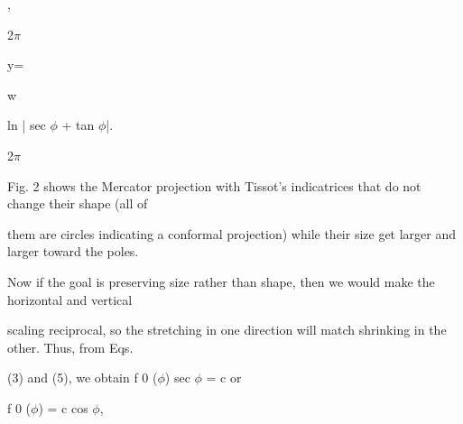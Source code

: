 \documentclass[a4paper,portrait,12pt]{article}
\begin{document}
,


\begin{flushleft}
2$\pi$
\end{flushleft}





\begin{flushleft}
y=
\end{flushleft}





\begin{flushleft}
w
\end{flushleft}


\begin{flushleft}
ln | sec $\phi$ + tan $\phi$|.
\end{flushleft}


\begin{flushleft}
2$\pi$
\end{flushleft}





\begin{flushleft}
Fig. 2 shows the Mercator projection with Tissot's indicatrices that do not change their shape (all of
\end{flushleft}


\begin{flushleft}
them are circles indicating a conformal projection) while their size get larger and larger toward the poles.
\end{flushleft}


\begin{flushleft}
Now if the goal is preserving size rather than shape, then we would make the horizontal and vertical
\end{flushleft}


\begin{flushleft}
scaling reciprocal, so the stretching in one direction will match shrinking in the other. Thus, from Eqs.
\end{flushleft}


\begin{flushleft}
(3) and (5), we obtain f 0 ($\phi$) sec $\phi$ = c or
\end{flushleft}


\begin{flushleft}
f 0 ($\phi$) = c cos $\phi$,
\end{flushleft}
\end{document}
